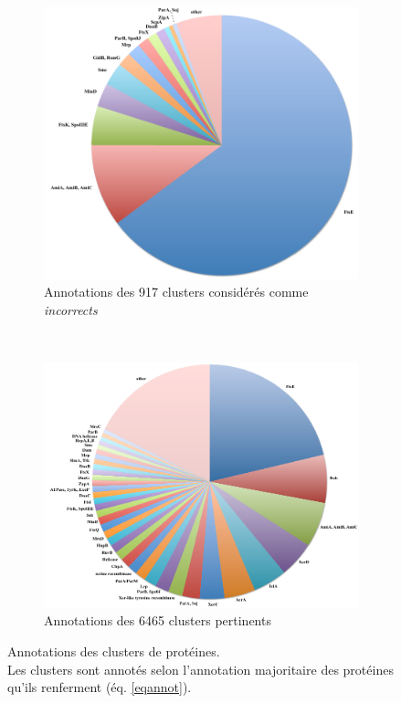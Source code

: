 \begin{figure}[H]
\begin{center}
\begin{subfigure}{0.7\textwidth}
\includegraphics[width=\textwidth]{./img/cluster_noise.png}
\caption{Annotations des 917 clusters considérés comme \textit{incorrects}}
\end{subfigure}
\\
\vspace*{1cm}
\hspace{1cm}
\begin{subfigure}{0.8\textwidth}
\includegraphics[width=\textwidth]{./img/cluster_annotate.png}
\caption{Annotations des 6465 clusters pertinents}
\end{subfigure}
\caption[Annotation des clusters de protéines]{Annotations des clusters de protéines. \\ Les clusters sont annotés selon l'annotation majoritaire des protéines qu'ils renferment (éq. \ref{eqannot}).}\label{figannotclust}
\end{center}
\end{figure}


